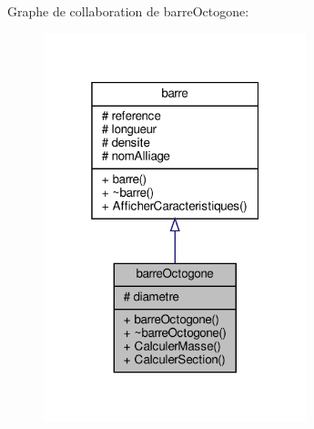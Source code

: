 Graphe de collaboration de barre\+Octogone\+:
\nopagebreak
\begin{figure}[H]
\begin{center}
\leavevmode
\includegraphics[width=217pt]{classbarre_octogone__coll__graph}
\end{center}
\end{figure}
